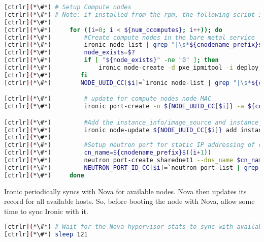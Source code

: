 \begin{lstlisting}[language=bash,keywords={}]
[ctrlr](*\#*) # Setup Compute nodes
[ctrlr](*\#*) # Note: if installed from the rpm, the following script is installed as setup_compute_nodes.sh 
[ctrlr](*\#*) 
[ctrlr](*\#*)     for ((i=0; i < ${num_ccomputes}; i++)); do
[ctrlr](*\#*)         #Create compute nodes in the bare metal service
[ctrlr](*\#*)         ironic node-list | grep "|\s*${cnodename_prefix}$((i+1))\s*|"
[ctrlr](*\#*)         node_exists=$?
[ctrlr](*\#*)         if [ "${node_exists}" -ne "0" ]; then
[ctrlr](*\#*)             ironic node-create -d pxe_ipmitool -i deploy_kernel=${DEPLOY_VMLINUZ_UUID} -i deploy_ramdisk=${DEPLOY_INITRD_UUID} -i ipmi_terminal_port=8023 -i ipmi_address=${cc_bmc[$i]} -i ipmi_username=${cc_bmc_username} -i ipmi_password=${cc_bmc_password} -p cpus=${CPU} -p memory_mb=${RAM_MB} -p local_gb=${DISK_GB} -p cpu_arch=${ARCH} -p capabilities="boot_mode:bios" -n ${cnodename_prefix}$((i+1))
[ctrlr](*\#*)        fi
[ctrlr](*\#*)        NODE_UUID_CC[$i]=`ironic node-list | grep "|\s*${cnodename_prefix}$((i+1))\s*|" | awk '{print $2}'`

[ctrlr](*\#*)         # update for compute nodes node MAC
[ctrlr](*\#*)         ironic port-create -n ${NODE_UUID_CC[$i]} -a ${cc_mac[$i]}

[ctrlr](*\#*)         #Add the instance_info/image_source and instance_info/root_gb
[ctrlr](*\#*)         ironic node-update ${NODE_UUID_CC[$i]} add instance_info/image_source=${USER_DISK_IMAGE_UUID} instance_info/root_gb=50
[ctrlr](*\#*) 
[ctrlr](*\#*)         #Setup neutron port for static IP addressing of compute nodes
[ctrlr](*\#*)         cn_name=${cnodename_prefix}$((i+1))
[ctrlr](*\#*)         neutron port-create sharednet1 --dns_name $cn_name --fixed-ip ip_address=${cc_ip[$i]} --name $cn_name --mac-address ${cc_mac[$i]}
[ctrlr](*\#*)         NEUTRON_PORT_ID_CC[$i]=`neutron port-list | grep "|\s*${cnodename_prefix}$((i+1))\s*|" | awk '{print $2}'`
[ctrlr](*\#*)     done
\end{lstlisting} 


	Ironic periodically syncs with Nova for available nodes. Nova then updates its record for all available hosts. So, before booting the node with Nova, allow some time to sync Ironic with it. 


\begin{lstlisting}[language=bash,keywords={}]
[ctrlr](*\#*) # Wait for the Nova hypervisor-stats to sync with available Ironic resources
[ctrlr](*\#*) sleep 121
\end{lstlisting} 

